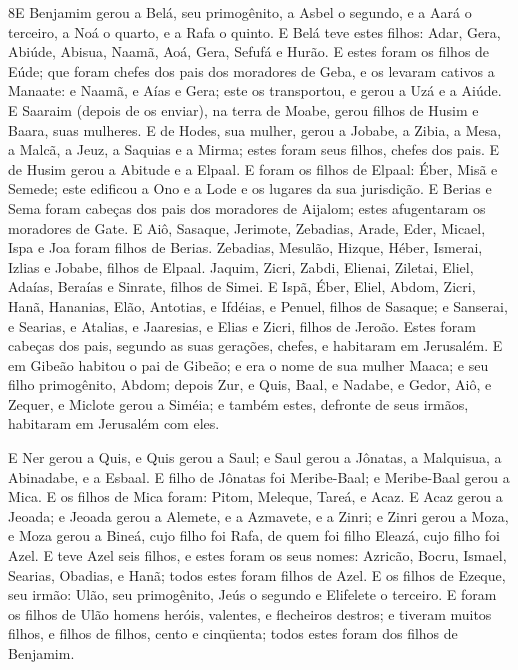 \lettrine{8} E Benjamim gerou a Belá, seu primogênito, a Asbel
o segundo, e a Aará o terceiro, a Noá o quarto, e a Rafa o
quinto. E Belá teve estes filhos: Adar, Gera, Abiúde,
Abisua, Naamã, Aoá, Gera, Sefufá e Hurão. E estes foram
os filhos de Eúde; que foram chefes dos pais dos moradores de Geba,
e os levaram cativos a Manaate: e Naamã, e Aías e Gera; este os
transportou, e gerou a Uzá e a Aiúde. E Saaraim (depois de os
enviar), na terra de Moabe, gerou filhos de Husim e Baara, suas
mulheres. E de Hodes, sua mulher, gerou a Jobabe, a Zibia, a
Mesa, a Malcã, a Jeuz, a Saquias e a Mirma; estes foram seus
filhos, chefes dos pais. E de Husim gerou a Abitude e a
Elpaal. E foram os filhos de Elpaal: Éber, Misã e Semede;
este edificou a Ono e a Lode e os lugares da sua jurisdição.
E Berias e Sema foram cabeças dos pais dos moradores de
Aijalom; estes afugentaram os moradores de Gate. E Aiô,
Sasaque, Jerimote, Zebadias, Arade, Eder, Micael, Ispa
e Joa foram filhos de Berias. Zebadias, Mesulão, Hizque,
Héber, Ismerai, Izlias e Jobabe, filhos de Elpaal.
Jaquim, Zicri, Zabdi, Elienai, Ziletai, Eliel,
Adaías, Beraías e Sinrate, filhos de Simei. E Ispã,
Éber, Eliel, Abdom, Zicri, Hanã, Hananias, Elão,
Antotias, e Ifdéias, e Penuel, filhos de Sasaque; e
Sanserai, e Searias, e Atalias, e Jaaresias, e Elias e Zicri,
filhos de Jeroão. Estes foram cabeças dos pais, segundo as
suas gerações, chefes, e habitaram em Jerusalém. E em Gibeão
habitou o pai de Gibeão; e era o nome de sua mulher Maaca; e
seu filho primogênito, Abdom; depois Zur, e Quis, Baal, e Nadabe,
e Gedor, Aiô, e Zequer, e Miclote gerou a Siméia; e
também estes, defronte de seus irmãos, habitaram em Jerusalém com
eles.

E Ner gerou a Quis, e Quis gerou a Saul; e Saul gerou a Jônatas,
a Malquisua, a Abinadabe, e a Esbaal. E filho de Jônatas foi
Meribe-Baal; e Meribe-Baal gerou a Mica. E os filhos de Mica
foram: Pitom, Meleque, Tareá, e Acaz. E Acaz gerou a Jeoada;
e Jeoada gerou a Alemete, e a Azmavete, e a Zinri; e Zinri gerou a
Moza, e Moza gerou a Bineá, cujo filho foi Rafa, de quem foi
filho Eleazá, cujo filho foi Azel. E teve Azel seis filhos, e
estes foram os seus nomes: Azricão, Bocru, Ismael, Searias, Obadias,
e Hanã; todos estes foram filhos de Azel. E os filhos de
Ezeque, seu irmão: Ulão, seu primogênito, Jeús o segundo e Elifelete
o terceiro. E foram os filhos de Ulão homens heróis,
valentes, e flecheiros destros; e tiveram muitos filhos, e filhos de
filhos, cento e cinqüenta; todos estes foram dos filhos de Benjamim.

